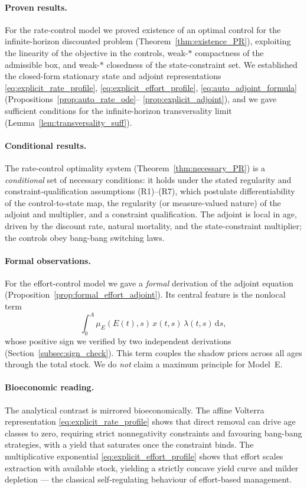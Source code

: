 \documentclass[pdflatex,sn-mathphys-num]{sn-jnl}
\theoremstyle{definition}
\theoremstyle{remark}
\newcommand{\dd}{\,\mathrm{d}}
\begin{document}
\paragraph{Proven results.}
For the rate-control model we proved existence of an optimal control for the
infinite-horizon discounted problem (Theorem~\ref{thm:existence_PR}),
exploiting the linearity of the objective in the controls, weak-$\ast$
compactness of the admissible box, and weak-$\ast$ closedness of the
state-constraint set. We established the closed-form stationary state and
adjoint representations
\eqref{eq:explicit_rate_profile}, \eqref{eq:explicit_effort_profile},
\eqref{eq:auto_adjoint_formula} (Propositions~\ref{prop:auto_rate_ode}--%
\ref{prop:explicit_adjoint}), and we gave sufficient conditions for the
infinite-horizon transversality limit (Lemma~\ref{lem:transversality_suff}).

\paragraph{Conditional results.}
The rate-control optimality system (Theorem~\ref{thm:necessary_PR}) is a
\emph{conditional} set of necessary conditions: it holds under the stated
regularity and constraint-qualification assumptions (R1)--(R7), which
postulate differentiability of the control-to-state map, the regularity (or
measure-valued nature) of the adjoint and multiplier, and a constraint
qualification. The adjoint is local in age, driven by the discount rate,
natural mortality, and the state-constraint multiplier; the controls obey
bang-bang switching laws.

\paragraph{Formal observations.}
For the effort-control model we gave a \emph{formal} derivation of the adjoint
equation (Proposition~\ref{prop:formal_effort_adjoint}). Its central feature
is the nonlocal term
\[
\int_0^A\mu_E(E(t),s)\,x(t,s)\,\lambda(t,s)\dd s,
\]
whose positive sign we verified by two independent derivations
(Section~\ref{subsec:sign_check}). This term couples the shadow prices across
all ages through the total stock. We do \emph{not} claim a maximum principle
for Model~E.

\paragraph{Bioeconomic reading.}
The analytical contrast is mirrored bioeconomically. The affine Volterra
representation \eqref{eq:explicit_rate_profile} shows that direct removal can
drive age classes to zero, requiring strict nonnegativity constraints and
favouring bang-bang strategies, with a yield that saturates once the
constraint binds. The multiplicative exponential
\eqref{eq:explicit_effort_profile} shows that effort scales extraction with
available stock, yielding a strictly concave yield curve and milder depletion
--- the classical self-regulating behaviour of effort-based management.
\end{document}

